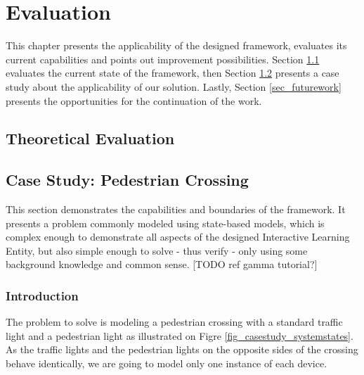 \chapter{Evaluation}
This chapter presents the applicability of the designed framework, evaluates its current capabilities and points out improvement possibilities. Section \ref{sec_theoeval} evaluates the current state of the framework, then Section \ref{sec_casestudy} presents a case study about the applicability of our solution. Lastly, Section \ref{sec_futurework} presents the opportunities for the continuation of the work.

\section{Theoretical Evaluation} \label{sec_theoeval}

\clearpage
\section{Case Study: Pedestrian Crossing} \label{sec_casestudy}
This section demonstrates the capabilities and boundaries of the framework. It presents a problem commonly modeled using state-based models, which is complex enough to demonstrate all aspects of the designed Interactive Learning Entity, but also simple enough to solve - thus verify - only using some background knowledge and common sense. [TODO ref gamma tutorial?]

\subsection{Introduction} \label{subs_casestudyintro}

The problem to solve is modeling a pedestrian crossing with a standard traffic light and a pedestrian light as illustrated on Figre \ref{fig_casestudy_systemstates}. As the traffic lights and the pedestrian lights on the opposite sides of the crossing behave identically, we are going to model only one instance of each device. 

